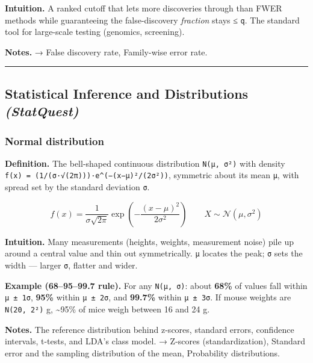 \documentclass[
  10pt,
  letterpaper,
  onecolumn]{article}
\begin{document}
\textbf{Intuition.} A ranked cutoff that lets more discoveries through
than FWER methods while guaranteeing the false-discovery \emph{fraction}
stays ≤ \texttt{q}. The standard tool for large-scale testing (genomics,
screening).

\textbf{Notes.} → False discovery rate, Family-wise error rate.

\begin{center}\rule{0.5\linewidth}{0.5pt}\end{center}

\hypertarget{statistical-inference-and-distributions-statquest}{%
\subsection{\texorpdfstring{Statistical Inference and Distributions
\emph{(StatQuest)}}{Statistical Inference and Distributions (StatQuest)}}\label{statistical-inference-and-distributions-statquest}}

\hypertarget{normal-distribution}{%
\subsubsection{Normal distribution}\label{normal-distribution}}

\textbf{Definition.} The bell-shaped continuous distribution
\texttt{N(μ,\ σ²)} with density
\texttt{f(x)\ =\ (1/(σ·√(2π)))·e\^{}(−(x−μ)²/(2σ²))}, symmetric about
its mean \texttt{μ}, with spread set by the standard deviation
\texttt{σ}.

\begin{equation*}
f(x)=\frac{1}{\sigma\sqrt{2\pi}}\exp\!\left(-\frac{(x-\mu)^2}{2\sigma^2}\right)
\qquad X\sim\mathcal{N}(\mu,\sigma^2)
\end{equation*}

\textbf{Intuition.} Many measurements (heights, weights, measurement
noise) pile up around a central value and thin out symmetrically.
\texttt{μ} locates the peak; \texttt{σ} sets the width --- larger
\texttt{σ}, flatter and wider.

\textbf{Example (68--95--99.7 rule).} For any \texttt{N(μ,\ σ)}: about
\textbf{68\%} of values fall within \texttt{μ\ ±\ 1σ}, \textbf{95\%}
within \texttt{μ\ ±\ 2σ}, and \textbf{99.7\%} within \texttt{μ\ ±\ 3σ}.
If mouse weights are \texttt{N(20,\ 2²)} g, \textasciitilde95\% of mice
weigh between 16 and 24 g.

\textbf{Notes.} The reference distribution behind z-scores, standard
errors, confidence intervals, t-tests, and LDA's class model. → Z-scores
(standardization), Standard error and the sampling distribution of the
mean, Probability distributions.
\end{document}
